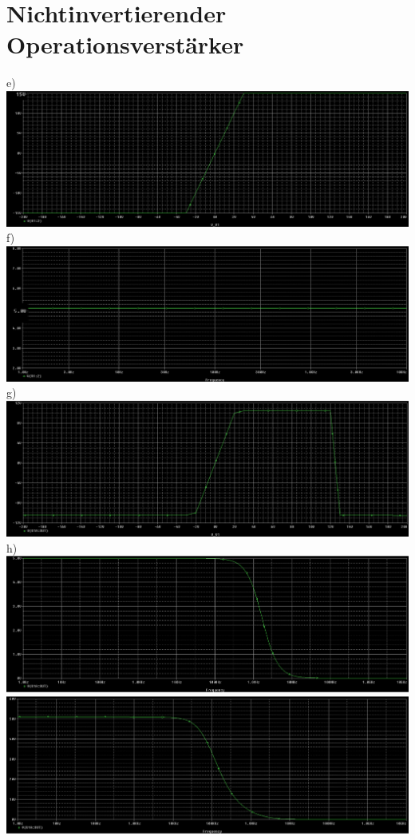 \documentclass[a4paper]{article}
\begin{document}
\section*{Nichtinvertierender Operationsverst\"arker}
e)\\
\includegraphics[scale=0.4]{SimulationNichtInverter_e}
\\[0.5cm]
f) \\
\includegraphics[scale=0.4]{SimulationNichtInverterAC_e}
g) \\
\includegraphics[scale=0.4]{SimulationNichtInverterAC_Real_f}
h) \\
\includegraphics[scale=0.4]{SimulationNichtInverterAC_Real_h_5}
\\[0.5cm]
\includegraphics[scale=0.4]{SimulationNichtInverterAC_Real_h_50}
\end{document}
